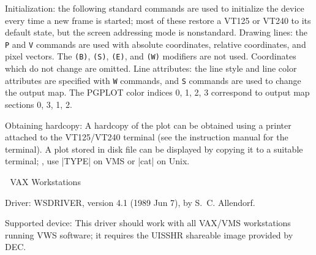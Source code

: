 \medskip\noindent
Initialization: the following standard commands are used to initialize
the device every time a new frame is started; most of these restore a
VT125 or VT240 to its default state, but the screen addressing mode is
nonstandard. 
\smallskip
{}
\medskip\noindent
Drawing lines: the {\tt P} and {\tt V} commands are used with absolute
coordinates, relative coordinates, and pixel vectors. The {\tt(B)},
{\tt(S)}, {\tt(E)}, and {\tt(W)} modifiers are not used. Coordinates
which do not change are omitted. 
\smallskip
{}
\medskip\noindent
Line attributes: the line style and line color attributes are 
specified with {\tt W} commands, \eg
\smallskip
{}
\smallskip\noindent
and {\tt S} commands are used to change the output
map.  The PGPLOT color indices 0, 1, 2, 3 correspond to output map
sections 0, 3, 1, 2.

\proclaim Obtaining hardcopy: A hardcopy of the plot can be obtained 
using a printer attached to the VT125/VT240 terminal (see the 
instruction manual for the terminal). A plot stored in disk file
can be displayed by copying it to a suitable terminal; \eg, use |TYPE| 
on VMS or |cat| on Unix.


\beginsection VAX Workstations

\proclaim Driver: WSDRIVER, version 4.1 (1989 Jun 7), by S.~C. 
Allendorf.

\proclaim Supported device: This driver should work with all VAX/VMS
workstations running VWS software; it requires the UISSHR shareable
image provided by DEC. 

